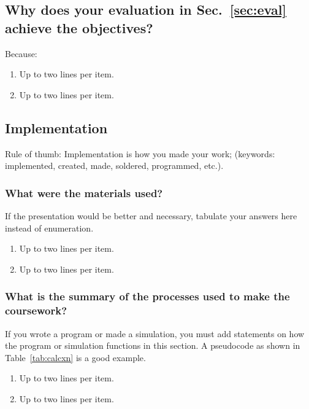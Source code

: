 \subsection{Why does your evaluation in Sec.~\ref{sec:eval}  achieve the objectives?}
Because:
\begin{enumerate}
\item Up to two lines per item.
\item Up to two lines per item.
\end{enumerate}



\subsection{Implementation}
\label{sec:implem}

Rule of thumb: Implementation is how you made your work; (keywords: implemented, created, made, soldered, programmed, etc.).


\subsubsection{What were the materials used?}
If the presentation would be better and necessary, tabulate your answers here instead of enumeration.
\begin{enumerate}
\item Up to two lines per item.
\item Up to two lines per item.
\end{enumerate}


\subsubsection{What is the summary of the processes used to make the coursework?}
If you wrote a program or made a simulation, you must add statements on how the program or simulation functions in this section.	A pseudocode as shown in Table~\ref{tab:calcxn} is a good example.
\begin{enumerate}
\item Up to two lines per item.
\item Up to two lines per item.
\end{enumerate}

